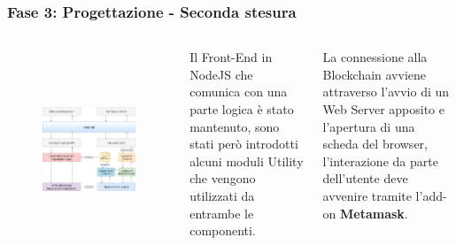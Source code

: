 \documentclass{beamer}
\begin{document}
\begin{frame}
	\frametitle{Fase 3: Progettazione - Seconda stesura}
	\begin{columns}
			\begin{figure}
				\includegraphics[width=1\textwidth, height=1.05\textwidth]{figures/architecture2.png}
			\end{figure}
		Il Front-End in NodeJS che comunica con una parte logica è stato mantenuto, sono stati però introdotti alcuni moduli Utility che vengono utilizzati da entrambe le componenti.

		La connessione alla Blockchain avviene attraverso l’avvio di un Web Server apposito e l’apertura di una scheda del browser, l’interazione da parte dell’utente deve avvenire tramite l’add-on \textbf{Metamask}.
	\end{columns}
\end{frame}
\end{document}
